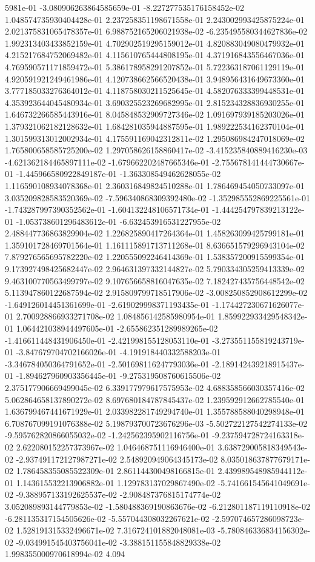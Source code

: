 5981e-01	-3.080906263864585659e-01	-8.227277535176158452e-02	1.048574735930404428e-01	2.237258351198671558e-01	2.243002993425875224e-01	2.021375831065478357e-01	6.988752165206021938e-02	-6.235495580344627836e-02	1.992313403433852159e-01	4.702902519295159012e-01	4.820883049080479932e-01	4.215217684752069482e-01	4.115610765444808195e-01	4.371916843556467036e-01	4.769590571171859472e-01	5.386178958291207852e-01	5.722363187061129119e-01	4.920591921249461986e-01	4.120738662566520438e-01	3.948956431649673360e-01	3.777185033276364012e-01	4.118758030211525645e-01	4.582076333399448531e-01	4.353923644045480934e-01	3.690325523269682995e-01	2.815234328836930255e-01	1.646732266585443916e-01	8.045848532909727346e-02	1.091697939185203026e-01	1.379321062182128632e-01	1.684281035944887595e-01	1.989222534162370104e-01	1.301599313012002934e-01	4.175591169042312811e-02	1.295086984247018069e-02	1.765800658585725200e-02	1.297058626158860417e-02	-3.415235840889416230e-03	-4.621362184465897111e-02	-1.679662202487665346e-01	-2.755678141444730667e-01	-1.445966580922849187e-01	-1.363308549462628055e-02	1.116590108934078368e-01	2.360316849824510288e-01	1.786469454050733097e-01	3.035209828583520369e-02	-7.596340868309392480e-02	-1.352985552869225561e-01	-1.743287997390352562e-01	-1.604132248106571734e-01	-1.444254797839213122e-01	-1.053738601296483612e-01	-6.632453916531227955e-02	2.488447736863829904e-02	1.226825890417264364e-01	1.458263099425799181e-01	1.359101728469701564e-01	1.161115891713711268e-01	8.636651579296943104e-02	7.879276565695782220e-02	1.220555092246414369e-01	1.538357200915599354e-01	9.173927498425682447e-02	2.964631397332144827e-02	5.790334305259413339e-02	9.463100770563499797e-02	9.107656658816047635e-02	7.182427435756448542e-02	5.113947860122687594e-02	2.915809799718517906e-02	-3.008250852908612299e-02	-1.649126014451361699e-01	-2.619029998371193435e-01	-1.174427230671626077e-01	2.700928866933271708e-02	1.084856142585980954e-01	1.859922933429548342e-01	1.064421038944497605e-01	-2.655862351289989265e-02	-1.416611448431906450e-01	-2.421998155128053110e-01	-3.273551155819243719e-01	-3.847679704702166026e-01	-4.191918440332588203e-01	-3.346784050364791652e-01	-2.501698116247793036e-01	-2.189142439218915437e-01	-1.894627960903356445e-01	-9.275319508760615506e-02	2.375177906669499045e-02	6.339177979617575953e-02	4.688358566030357416e-02	5.062864658137890272e-02	8.697680184787845437e-02	1.239592912662785540e-01	1.636799467441671929e-01	2.033982281749294740e-01	1.355788588040298948e-01	6.708767099191076388e-02	5.198793700723676296e-03	-5.502722127542274133e-02	-9.595762820866055032e-02	-1.242562395902116756e-01	-9.237594728724163318e-02	2.622080152257373967e-02	1.046468751116946400e-01	3.638729005818349543e-02	-2.937491172127987271e-02	2.548920949064345173e-02	8.035018637877679171e-02	1.786458355085522309e-01	2.861144300498166815e-01	2.439989548985944112e-01	1.143615532213906882e-01	1.129783137029867490e-02	-5.741661545641049691e-02	-9.388957133192625537e-02	-2.908487376815174774e-02	3.052089893144779853e-02	-1.580488369190863676e-02	-6.212801187119110918e-02	-6.281135317154505626e-02	-5.557044308032267621e-02	-2.597074657286098723e-02	1.528191315332496671e-02	7.316724101882048081e-03	-5.780846336834156302e-02	-9.034991545403756041e-02	-3.388151155848829338e-02	1.998355000970618994e-02	4.094